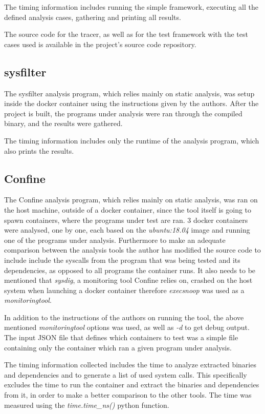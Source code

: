 The timing information includes running the simple framework, executing all the defined analysis cases, gathering and printing all results.

The source code for the tracer, as well as for the test framework with the test cases used is available in the project's source code repository.

\subsection {sysfilter}
The sysfilter \cite{ref_sp_3} analysis program, which relies mainly on static analysis, was setup inside the docker container using the instructions given by the authors.
After the project is built, the programs under analysis were ran through the compiled binary, and the results were gathered.

The timing information includes only the runtime of the analysis program, which also prints the results.

\subsection {Confine}
The Confine \cite{ref_sp_2} analysis program, which relies mainly on static analysis, was ran on the host machine, outside of a docker container, since the tool itself is going to spawn containers, where the programs under test are ran.
3 docker containers were analysed, one by one, each based on the \textit{ubuntu:18.04} image and running one of the programs under analysis.
Furthermore to make an adequate comparison between the analysis tools the author has modified the source code to include include the syscalls from the program that was being tested and its dependencies, as opposed to all programs the container runs.
It also needs to be mentioned that \textit{sysdig}, a monitoring tool Confine relies on, crashed on the host system when launching a docker container therefore \textit{execsnoop} was used as a \textit{monitoringtool}.

In addition to the instructions of the authors on running the tool, the above mentioned \textit{monitoringtool} options was used, as well as \textit{-d} to get debug output.
The input JSON file that defines which containers to test was a simple file containing only the container which ran a given program under analysis.

The timing information collected includes the time to analyze extracted binaries and dependencies and to generate a list of used system calls. This specifically excludes the time to run the container and extract the binaries and dependencies from it, in order to make a better comparison to the other tools. The time was measured using the \textit{time.time\_ns()} python function.

